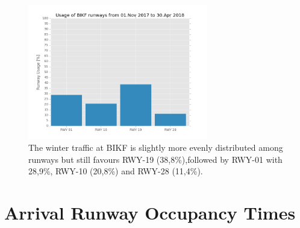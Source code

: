\begin{figure}[h]
    \centering
    \includegraphics[width=0.7\textwidth]{graphics/fig_runway_usage_winter}
    \caption[Winter runway usage at BIKF]{The winter traffic at BIKF is slightly more evenly distributed among runways but still favours RWY-19 (38,8\%),followed by RWY-01 with 28,9\%, RWY-10 (20,8\%) and RWY-28 (11,4\%).}
    \label{fig:runway_usage_winter}
\end{figure}

\clearpage
\chapter{Arrival Runway Occupancy Times\label{cha:AROTs}}

\begin{table}[h]
\centering
{}
\caption[AROTs for the air traffic mix by RECAT]{AROT statistics for the air traffic mix at BIKF by RECAT-EU categories. The count is the number of landings in peak hours since October 2017}
\label{tab:AROT_RECAT_stats}
\end{table}

